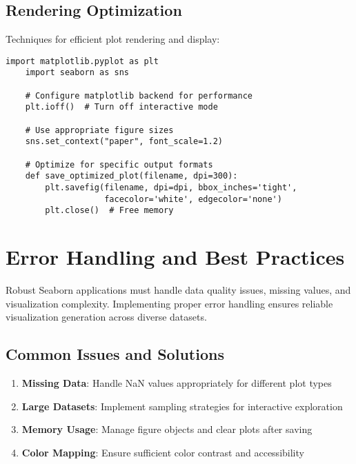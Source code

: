 \subsection{Rendering Optimization}
\label{subsec:rendering}

Techniques for efficient plot rendering and display:

\begin{lstlisting}[language=MyPython, caption={Rendering Optimization}, label={lst:rendering}]
	import matplotlib.pyplot as plt
	import seaborn as sns
	
	# Configure matplotlib backend for performance
	plt.ioff()  # Turn off interactive mode
	
	# Use appropriate figure sizes
	sns.set_context("paper", font_scale=1.2)
	
	# Optimize for specific output formats
	def save_optimized_plot(filename, dpi=300):
	    plt.savefig(filename, dpi=dpi, bbox_inches='tight',
	                facecolor='white', edgecolor='none')
	    plt.close()  # Free memory
\end{lstlisting}

\section{Error Handling and Best Practices}
\label{sec:best_practices}

Robust Seaborn applications must handle data quality issues, missing values, and visualization complexity. Implementing proper error handling ensures reliable visualization generation across diverse datasets.

\subsection{Common Issues and Solutions}
\label{subsec:common_issues}

\begin{enumerate}
	\item \textbf{Missing Data}: Handle NaN values appropriately for different plot types
	\item \textbf{Large Datasets}: Implement sampling strategies for interactive exploration
	\item \textbf{Memory Usage}: Manage figure objects and clear plots after saving
	\item \textbf{Color Mapping}: Ensure sufficient color contrast and accessibility
\end{enumerate}

